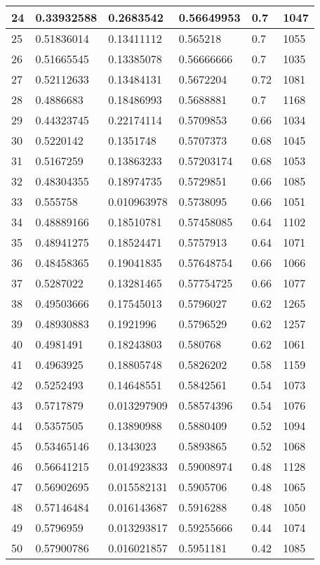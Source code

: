 \begin{longtable}{|l|l|l|l|l|l|}
24 & 0.33932588 & 0.2683542 & 0.56649953 & 0.7 & 1047 \\ \hline 
25 & 0.51836014 & 0.13411112 & 0.565218 & 0.7 & 1055 \\ \hline 
26 & 0.51665545 & 0.13385078 & 0.56666666 & 0.7 & 1035 \\ \hline 
27 & 0.52112633 & 0.13484131 & 0.5672204 & 0.72 & 1081 \\ \hline 
28 & 0.4886683 & 0.18486993 & 0.5688881 & 0.7 & 1168 \\ \hline 
29 & 0.44323745 & 0.22174114 & 0.5709853 & 0.66 & 1034 \\ \hline 
30 & 0.5220142 & 0.1351748 & 0.5707373 & 0.68 & 1045 \\ \hline 
31 & 0.5167259 & 0.13863233 & 0.57203174 & 0.68 & 1053 \\ \hline 
32 & 0.48304355 & 0.18974735 & 0.5729851 & 0.66 & 1085 \\ \hline 
33 & 0.555758 & 0.010963978 & 0.5738095 & 0.66 & 1051 \\ \hline 
34 & 0.48889166 & 0.18510781 & 0.57458085 & 0.64 & 1102 \\ \hline 
35 & 0.48941275 & 0.18524471 & 0.5757913 & 0.64 & 1071 \\ \hline 
36 & 0.48458365 & 0.19041835 & 0.57648754 & 0.66 & 1066 \\ \hline 
37 & 0.5287022 & 0.13281465 & 0.57754725 & 0.66 & 1077 \\ \hline 
38 & 0.49503666 & 0.17545013 & 0.5796027 & 0.62 & 1265 \\ \hline 
39 & 0.48930883 & 0.1921996 & 0.5796529 & 0.62 & 1257 \\ \hline 
40 & 0.4981491 & 0.18243803 & 0.580768 & 0.62 & 1061 \\ \hline 
41 & 0.4963925 & 0.18805748 & 0.5826202 & 0.58 & 1159 \\ \hline 
42 & 0.5252493 & 0.14648551 & 0.5842561 & 0.54 & 1073 \\ \hline 
43 & 0.5717879 & 0.013297909 & 0.58574396 & 0.54 & 1076 \\ \hline 
44 & 0.5357505 & 0.13890988 & 0.5880409 & 0.52 & 1094 \\ \hline 
45 & 0.53465146 & 0.1343023 & 0.5893865 & 0.52 & 1068 \\ \hline 
46 & 0.56641215 & 0.014923833 & 0.59008974 & 0.48 & 1128 \\ \hline 
47 & 0.56902695 & 0.015582131 & 0.5905706 & 0.48 & 1065 \\ \hline 
48 & 0.57146484 & 0.016143687 & 0.5916288 & 0.48 & 1050 \\ \hline 
49 & 0.5796959 & 0.013293817 & 0.59255666 & 0.44 & 1074 \\ \hline 
50 & 0.57900786 & 0.016021857 & 0.5951181 & 0.42 & 1085 \\ \hline 
\end{longtable}